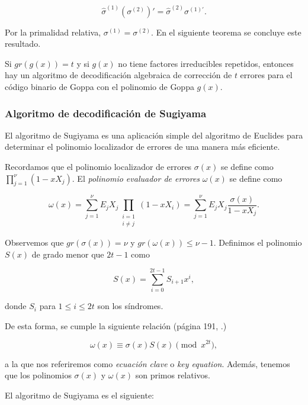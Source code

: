$$\hat{\sigma}^{(1)} \left( \sigma^{(2)} \right) ' = \hat{\sigma}^{(2)} \sigma^{(1)'}.$$

Por la primalidad relativa, $\sigma^{(1)} = \sigma^{(2)}$. En el siguiente teorema se concluye este resultado.

\begin{theorem}
    Si $gr(g(x)) = t$ y si $g(x)$ no tiene factores irreducibles repetidos, entonces hay un algoritmo de decodificación algebraica de corrección de $t$ errores para el código binario de Goppa con el polinomio de Goppa $g(x)$.
\end{theorem}

\subsubsection{Algoritmo de decodificación de Sugiyama}

El algoritmo de Sugiyama es una aplicación simple del algoritmo de Euclides para determinar el polinomio localizador de errores de una manera más eficiente.

Recordamos que el polinomio localizador de errores $\sigma(x)$ se define como $\prod_{j=1}^{\nu} (1 - xX_j)$. El \emph{polinomio evaluador de errores} $\omega(x)$ se define como

\begin{equation}
    \label{def:polinomio_evaluador_errores}
    \omega(x) = \sum_{j=1}^{\nu} E_j X_j \prod_{\substack{i=1\\ i \neq j}} (1 - xX_i) = \sum_{j=1}^{\nu} E_j X_j \frac{\sigma(x)}{1 - xX_j}.
\end{equation}

Observemos que $gr(\sigma(x)) = \nu$ y $gr(\omega(x)) \leq \nu - 1$. Definimos el polinomio $S(x)$ de grado menor que $2t - 1$ como

$$S(x) = \sum_{i=0}^{2t - 1} S_{i+1} x^i,$$

donde $S_i$ para $1 \leq i \leq 2t$ son los síndromes.

De esta forma, se cumple la siguiente relación (página 191, \cite{Huffman_Pless_2010}.)

$$\omega(x) \equiv \sigma(x) S(x) \pmod{x^{2t}},$$

a la que nos referiremos como \emph{ecuación clave} o \emph{key equation}. Además, tenemos que los polinomios $\sigma(x)$ y $\omega(x)$ son primos relativos.

El algoritmo de Sugiyama es el siguiente:

